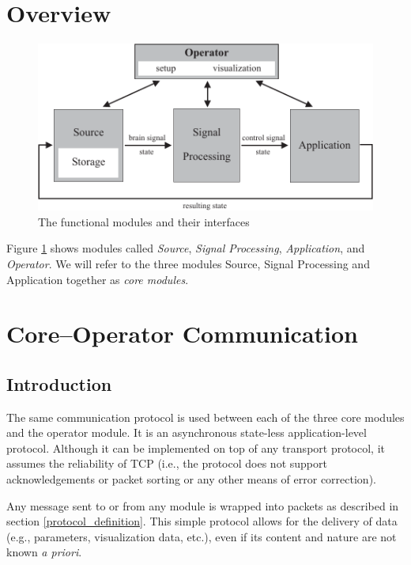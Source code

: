 \documentclass[letterpaper,oneside,12pt]{book}
\begin{document}
\section{Overview}

\begin{figure}[ht]
 \centerline{\includegraphics{figures/modules}}
 \caption{The functional modules and their interfaces}
 \label{fig:modules}
\end{figure}

Figure \ref{fig:modules} shows modules called \textit{Source}, \textit{Signal 
Processing}, \textit{Application}, and \textit{Operator}. We will refer to the 
three modules Source, Signal Processing and Application together as \textit{core 
modules}.




\section{Core--Operator Communication}

\subsection{Introduction}

The same communication protocol is used between each of the three core modules 
and the operator module. It is an asynchronous state-less application-level 
protocol. Although it can be implemented on top of any transport protocol, it 
assumes the reliability of TCP (i.e., the protocol does not support 
acknowledgements or packet sorting or any other means of error correction).

Any message sent to or from any module is wrapped into packets as described in 
section \ref{protocol_definition}. This simple protocol allows for the delivery 
of data (e.g., parameters, visualization data, etc.), even if its content and 
nature are not known \textit{a priori}.
\end{document}

